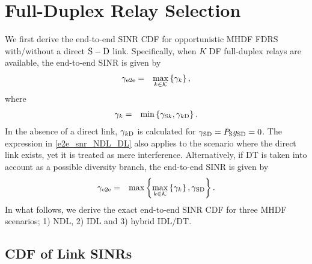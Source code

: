 \documentclass[10pt,journal]{IEEEtran}
\begin{document}
\section{Full-Duplex Relay Selection}
We first derive the end-to-end \ac{SINR} \ac{CDF} for opportunistic \ac{MHDF} \ac{FDRS} with/without a direct ${\rm S - D}$ link. Specifically, when $K$ \ac{DF} full-duplex relays are available, the end-to-end \ac{SINR} is given by
\begin{eqnarray}
\gamma_{\rm e2e}
&=& \max_{k\in {\mathcal{K}}}\left\{\gamma_{k}\right\}, \label{e2e_snr_NDL_DL}
\end{eqnarray}
where
\begin{eqnarray}
\gamma_{k}
&=& \min\left\{\gamma_{{\rm S} k},\gamma_{k {\rm D}}\right\}. \label{k_th_hop_SINR}
\end{eqnarray}
In the absence of a direct link, $\gamma_{k {\rm D}}$ is calculated for $\gamma_{{\rm S} {\rm D}}=P_{{\rm S}}g_{{\rm S} {\rm D}}=0$. The expression in \eqref{e2e_snr_NDL_DL} also applies to the scenario where the direct link exists, yet it is treated as mere interference. Alternatively, if \ac{DT} is taken into account as a possible diversity branch, the end-to-end \ac{SINR} is given by
\begin{eqnarray}
\gamma_{\rm e2e}
&=& \max\left\{\max_{k\in {\mathcal{K}}}\left\{\gamma_{k}\right\},\gamma_{{\rm S} {\rm D}}\right\}. \label{general_e2e_snr_hybrid}
\end{eqnarray}
In what follows, we derive the exact end-to-end \ac{SINR} \ac{CDF} for three \ac{MHDF} scenarios; 1) \ac{NDL}, 2) \ac{IDL} and 3) hybrid \ac{IDL}/\ac{DT}.

\subsection{CDF of Link SINRs}
\end{document}
